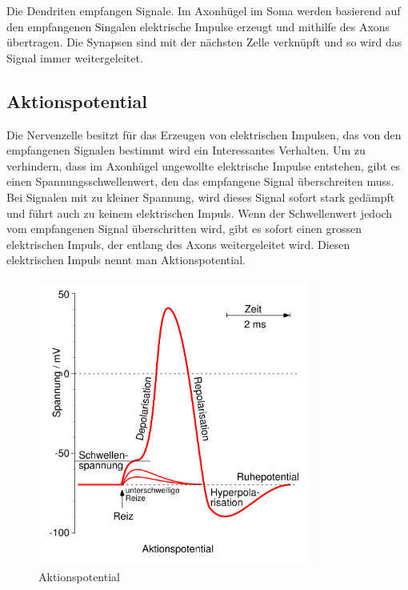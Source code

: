 \begin{refsection}
Die Dendriten empfangen Signale. 
Im Axonhügel im Soma werden basierend auf den empfangenen Singalen elektrische Impulse erzeugt und mithilfe des Axons übertragen.
Die Synapsen sind mit der nächsten Zelle verknüpft und so wird das Signal immer weitergeleitet.

\subsection{Aktionspotential}
Die Nervenzelle besitzt für das Erzeugen von elektrischen Impulsen, das von den empfangenen Signalen bestimmt wird ein Interessantes Verhalten.
Um zu verhindern, dass im Axonhügel ungewollte elektrische Impulse entstehen, gibt es einen Spannungsschwellenwert,
den das empfangene Signal überschreiten muss.
Bei Signalen mit zu kleiner Spannung, wird dieses Signal sofort stark gedämpft und führt auch zu keinem elektrischen Impuls.
Wenn der Schwellenwert jedoch vom empfangenen Signal überschritten wird, gibt es sofort einen grossen elektrischen Impuls,
der entlang des Axons weitergeleitet wird. 
Diesen elektrischen Impuls nennt man Aktionspotential.
\begin{figure}[h]
    \centering
    \includegraphics[width=0.8\textwidth]{papers/nerven/Bilder/Aktionspotential.png}
    \caption{Aktionspotential}
    \label{fig:Aktionspotential}
\end{figure}


\end{refsection}
